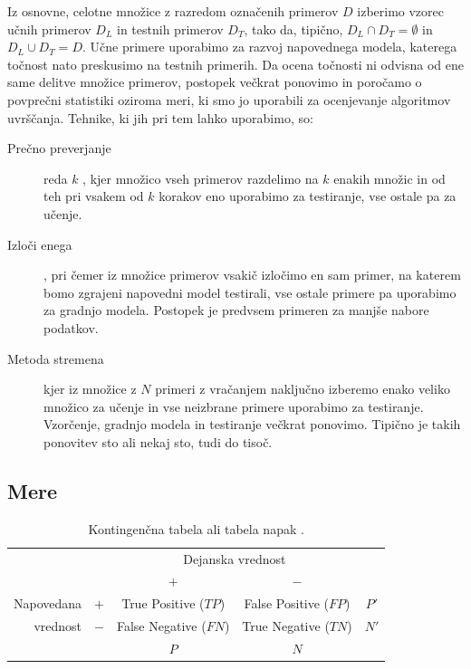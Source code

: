 Iz osnovne, celotne množice z razredom označenih primerov $D$ izberimo vzorec učnih primerov $D_L$ in testnih primerov $D_T$, tako da, tipično, $D_L\cap D_T=\emptyset$ in $D_L\cup D_T=D$. Učne primere uporabimo za razvoj napovednega modela, katerega točnost nato preskusimo na testnih primerih. Da ocena točnosti ni odvisna od ene same delitve množice primerov, postopek večkrat ponovimo in poročamo o povprečni statistiki oziroma meri, ki smo jo uporabili za ocenjevanje algoritmov uvrščanja. Tehnike, ki jih pri tem lahko uporabimo, so:
\begin{description}
\item[Prečno preverjanje] reda $k$ , kjer množico vseh primerov razdelimo na $k$ enakih množic in od teh pri vsakem od $k$ korakov eno uporabimo za testiranje, vse ostale pa za učenje.
\item[Izloči enega] , pri čemer iz množice primerov vsakič izločimo en sam primer, na katerem bomo zgrajeni napovedni model testirali, vse ostale primere pa uporabimo za gradnjo modela. Postopek je predvsem primeren za manjše nabore podatkov.
\item[Metoda stremena]  kjer iz množice z $N$ primeri z vračanjem naključno izberemo enako veliko množico za učenje in vse neizbrane primere uporabimo za testiranje. Vzorčenje, gradnjo modela in testiranje večkrat ponovimo. Tipično je takih ponovitev sto ali nekaj sto, tudi do tisoč.
\end{description}

\subsection{Mere}

\begin{table}[htbp]
\caption{Kontingenčna tabela ali tabela napak .}
\label{t-confusion-matrix}
\begin{center}
\begin{tabular}{rcccc}
& & \multicolumn{2}{c}{Dejanska vrednost} \\ 
& & $+$ & $-$ \\
\cmidrule(r){3-4}
Napovedana & $+$ & True Positive ($TP$) & False Positive ($FP$) & $P'$ \\
vrednost & $-$ & False Negative ($FN$) & True Negative ($TN$) & $N'$ \\ \cmidrule(r){3-4}
& & $P$ & $N$ \\
\end{tabular}
\end{center}
\end{table}


